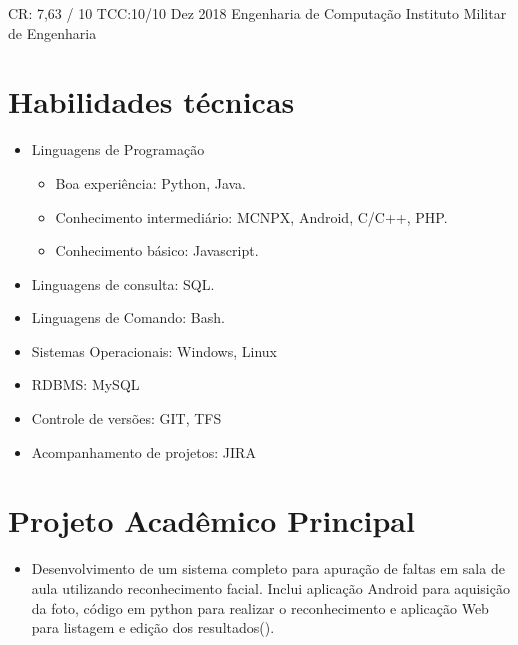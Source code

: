 \documentclass{tccv}
\begin{document}
\begin{yearlist}

    \item[CR: 7,63 / 10 \newline TCC:10/10 ]{Dez 2018}
        {Engenharia de Computação}
        {Instituto Militar de Engenharia}

\end{yearlist}

\section{Habilidades técnicas}
    
    \begin{itemize}  
        \item Linguagens de Programação
            \begin{itemize}
                \item Boa experiência: Python, Java.
                \item Conhecimento intermediário: MCNPX, Android, C/C++, PHP.
                \item Conhecimento básico: Javascript.
            \end{itemize}
        \item Linguagens de consulta: SQL.
        \item Linguagens de Comando: Bash.
        \item Sistemas Operacionais: Windows, Linux
        \item RDBMS: MySQL 
        \item Controle de versões: GIT, TFS
        \item Acompanhamento de projetos: JIRA
    \end{itemize}

\section{Projeto Acadêmico Principal}
    
    \begin{itemize}
        \item Desenvolvimento de um sistema completo para apuração de faltas em sala de aula utilizando reconhecimento facial. Inclui aplicação Android para aquisição da foto, código em python para realizar o reconhecimento e aplicação Web para listagem e edição dos resultados(\href{https://github.com/gdelfs/Tchau-Papeleta-de-Faltas}{\faCode}).
     \begin{comment}
        \item Desenvolvimento de um chat entre mobile e computador utilizando comunicação TCP entre as respectivas aplicações Android e Java (\href{https://github.com/gdelfs/Messenger-Android-Computador}{\faCode}).
     \end{comment}
    \end{itemize}
\end{document}
